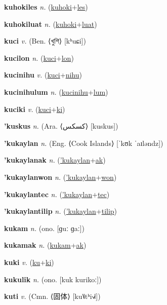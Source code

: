 \textbf{\hypertarget{kuhokiles}{kuhokiles}} \textit{n.} (\hyperlink{kuhoki}{kuhoki}+\allowbreak \hyperlink{les}{les})


\textbf{\hypertarget{kuhokiluat}{kuhokiluat}} \textit{n.} (\hyperlink{kuhoki}{kuhoki}+\allowbreak \hyperlink{luat}{luat})


\textbf{\hypertarget{kuci}{kuci}} \textit{v.} (Ben. ⟨{\bengali{}খুশি}⟩ [kʰuɕi])


\textbf{\hypertarget{kucilon}{kucilon}} \textit{n.} (\hyperlink{kuci}{kuci}+\allowbreak \hyperlink{lon}{lon})


\textbf{\hypertarget{kucinihu}{kucinihu}} \textit{v.} (\hyperlink{kuci}{kuci}+\allowbreak \hyperlink{nihu}{nihu})


\textbf{\hypertarget{kucinihulum}{kucinihulum}} \textit{n.} (\hyperlink{kucinihu}{kucinihu}+\allowbreak \hyperlink{lum}{lum})


\textbf{\hypertarget{kuciki}{kuciki}} \textit{v.} (\hyperlink{kuci}{kuci}+\allowbreak \hyperlink{ki}{ki})


\textbf{\hypertarget{'kuskus}{'kuskus}} \textit{n.} (Ara. ⟨{\arabics{}كسكس}⟩ [kuskus])


\textbf{\hypertarget{'kukaylan}{'kukaylan}} \textit{n.} (Eng. ⟨Cook Islands⟩ [ˈkʊk ˈaɪləndz])


\textbf{\hypertarget{'kukaylanak}{'kukaylanak}} \textit{n.} (\hyperlink{'kukaylan}{'kukaylan}+\allowbreak \hyperlink{ak}{ak})


\textbf{\hypertarget{'kukaylanwon}{'kukaylanwon}} \textit{n.} (\hyperlink{'kukaylan}{'kukaylan}+\allowbreak \hyperlink{won}{won})


\textbf{\hypertarget{'kukaylantec}{'kukaylantec}} \textit{n.} (\hyperlink{'kukaylan}{'kukaylan}+\allowbreak \hyperlink{tec}{tec})


\textbf{\hypertarget{'kukaylantilip}{'kukaylantilip}} \textit{n.} (\hyperlink{'kukaylan}{'kukaylan}+\allowbreak \hyperlink{tilip}{tilip})


\textbf{\hypertarget{kukam}{kukam}} \textit{n.} (ono. [ɡuː ɡaː])


\textbf{\hypertarget{kukamak}{kukamak}} \textit{n.} (\hyperlink{kukam}{kukam}+\allowbreak \hyperlink{ak}{ak})


\textbf{\hypertarget{kuki}{kuki}} \textit{v.} (\hyperlink{ku}{ku}+\allowbreak \hyperlink{ki}{ki})


\textbf{\hypertarget{kukulik}{kukulik}} \textit{n.} (ono. [kuk kurikoː])


\textbf{\hypertarget{kuti}{kuti}} \textit{v.} (Cmn. ⟨{\chinese{}固体}⟩ [ku˥˩tʰi˧˩˧])


